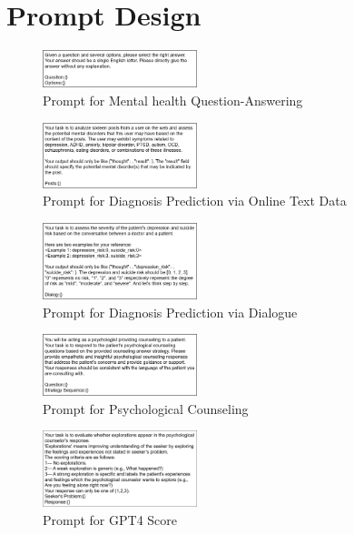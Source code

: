 
\section{Prompt Design}
\label{app: prompt design}

\begin{figure}[htpb]
    \centering
    \includegraphics[width=0.4\textwidth]{Figure/Prompt1.png}
    \caption{Prompt for Mental health Question-Answering}
\end{figure}

\begin{figure}[htpb]
    \centering
    \includegraphics[width=0.4\textwidth]{Figure/Prompt2.png}
    \caption{Prompt for Diagnosis Prediction via Online Text Data}
\end{figure}

\begin{figure}[htpb]
    \centering
    \includegraphics[width=0.4\textwidth]{Figure/Prompt3.png}
    \caption{Prompt for Diagnosis Prediction via Dialogue}
\end{figure}

\begin{figure}[htpb]
    \centering
    \includegraphics[width=0.4\textwidth]{Figure/Prompt4.png}
    \caption{Prompt for Psychological Counseling}
\end{figure}

\begin{figure}[htpb]
    \centering
    \includegraphics[width=0.4\textwidth]{Figure/Prompt5.png}
    \caption{Prompt for GPT4 Score}
\end{figure}


